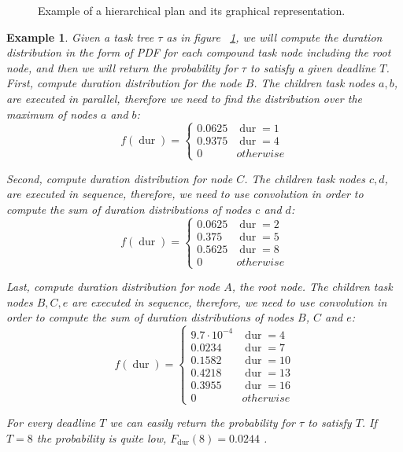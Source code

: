 \documentclass{article}
\newtheorem{example}{Example}
\DeclareMathOperator{\dur}{dur}
\begin{document}
\begin{figure}
	\centering
	\caption{Example of a hierarchical plan and its graphical representation.}
	\label{fig:hierarchical plan}
\end{figure}


\begin{example}

Given a task tree $\tau$ as in figure ~\ref{fig:hierarchical plan}, we will compute the duration distribution in the form of PDF for each compound task node including the root node, and then we will return the probability for $\tau$ to satisfy a given deadline $T$. 
First, compute duration distribution for the node $B$. The children task nodes $a,b$, are executed in parallel, therefore we need to find the distribution over the maximum of nodes $a$ and $b$:  
$$f(\dur)=
\begin{cases}
0.0625 & \dur=1 \\
0.9375 & \dur=4 \\
0 & otherwise
\end{cases}$$

Second, compute duration distribution for node $C$. The children task nodes $c,d$, are executed in sequence, therefore, we need to use convolution in order to compute the sum of duration distributions of nodes $c$ and $d$:  
$$f(\dur)=
\begin{cases}
0.0625 & \dur=2 \\
0.375 & \dur=5 \\
0.5625 & \dur=8 \\
0 & otherwise
\end{cases}$$

Last, compute duration distribution for node $A$, the root node. The children task nodes $B,C,e$ are executed in sequence, therefore, we need to use convolution in order to compute the sum of duration distributions of nodes $B$, $C$ and $e$: 
$$f(\dur)=
\begin{cases}
9.7\cdot 10^{-4} & \dur=4 \\
0.0234 & \dur=7 \\
0.1582 & \dur=10 \\
0.4218 & \dur=13 \\
0.3955 & \dur=16 \\
0 & otherwise
\end{cases}$$

For every deadline $T$ we can easily return the probability for $\tau$ to satisfy $T$. If $T=8$ the probability is quite low, $F_{\dur}(8)=0.0244$ . 
\end{example}
\end{document}
